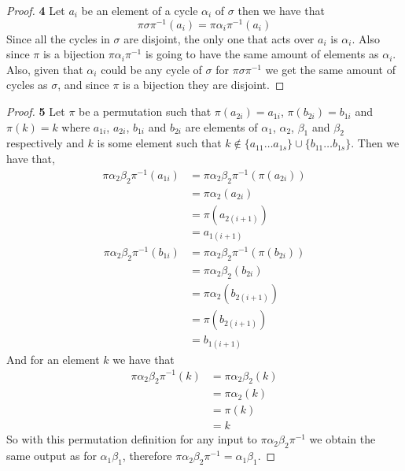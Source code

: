 \documentclass[11pt]{article}
\begin{document}
		\begin{proof}{\textbf{4}}
			Let $a_i$ be an element of a cycle $\alpha_i$ of $\sigma$
			then we have that 
			$$\pi\sigma\pi^{-1}(a_i) = \pi\alpha_i\pi^{-1}(a_i)$$
			Since all the cycles in $\sigma$ are disjoint, the only one that acts
			over $a_i$ is $\alpha_i$. Also since $\pi$ is a bijection
			$\pi\alpha_i\pi^{-1}$ is going to have the same amount of
			elements as $\alpha_i$. Also, given that $\alpha_i$ could be any cycle of
			$\sigma$ for $\pi\sigma\pi^{-1}$ we get the same amount of cycles
			as $\sigma$, and since $\pi$ is a bijection they are disjoint.
		\end{proof}
\cleardoublepage
		\begin{proof}{\textbf{5}}
			Let $\pi$ be a permutation such that $\pi(a_{2i}) = a_{1i}$,
			$\pi(b_{2i})=b_{1i}$ and $\pi(k) = k$ where $a_{1i}$, $a_{2i}$,
			$b_{1i}$ and $b_{2i}$ are elements of $\alpha_1$, $\alpha_2$, $\beta_1$
			and $\beta_2$ respectively and $k$ is some element such that
			$k \notin \{a_{11} \dots a_{1s} \} \cup \{b_{11} \dots b_{1s} \}$.
			Then we have that,
			\begin{align*}
				\pi\alpha_2\beta_2\pi^{-1}(a_{1i}) &= \pi\alpha_2\beta_2\pi^{-1}(\pi(a_{2i})) \\
									   		       &= \pi\alpha_2(a_{2i}) \\
									   			   &= \pi(a_{2(i+1)}) \\
									   		       &= a_{1(i+1)}
			\end{align*}
			\begin{align*}
				\pi\alpha_2\beta_2\pi^{-1}(b_{1i}) &= \pi\alpha_2\beta_2\pi^{-1}(\pi(b_{2i})) \\
									   		       &= \pi\alpha_2\beta_2(b_{2i}) \\
									   			   &= \pi\alpha_2(b_{2(i+1)}) \\
									   			   &= \pi(b_{2(i+1)}) \\
												   &= b_{1(i+1)}
			\end{align*}
			And for an element $k$ we have that
			\begin{align*}
				\pi\alpha_2\beta_2\pi^{-1}(k) &= \pi\alpha_2\beta_2(k) \\
											  &= \pi\alpha_2(k) \\
											  &= \pi(k) \\
											  &= k
			\end{align*}
			So with this permutation definition for any input to $\pi\alpha_2\beta_2\pi^{-1}$
			we obtain the same output as for $\alpha_1\beta_1$, therefore
			$\pi\alpha_2\beta_2\pi^{-1}=\alpha_1\beta_1$.
		\end{proof}
\end{document}
